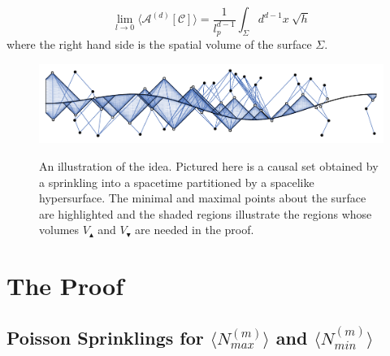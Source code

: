 \documentclass[12pt]{article}
\newcommand{\be}{\begin{equation}}
\newcommand{\ee}{\end{equation}}
\begin{document}
\be\label{eq:conjecture_for_area}
\lim_{l\rightarrow0}\langle \mathcal{A}^{(d)}[\mathcal{C}] \rangle= \frac{1}{l_p^{d-1}}\int_{\Sigma} d^{d-1}x\: \sqrt{h}
\ee
where the right hand side is the spatial volume of the surface $\Sigma$.

\begin{figure}
  \centering
    {\includegraphics[width=\textwidth]{minmaxplot}}
     \caption{An illustration of the idea. Pictured here is a causal set obtained by a sprinkling into a spacetime partitioned by a spacelike hypersurface. The minimal and maximal points about the surface are highlighted and the shaded regions illustrate the regions whose volumes $V_\blacktriangle$ and $V_\blacktriangledown$ are needed in the proof.}
     \label{fig:Nmin_Nmax}
\end{figure}

\section{The Proof}

\subsection{Poisson Sprinklings for $\langle N_{max}^{(m)}\rangle$ and $\langle N_{min}^{(m)}\rangle$}
\end{document}
